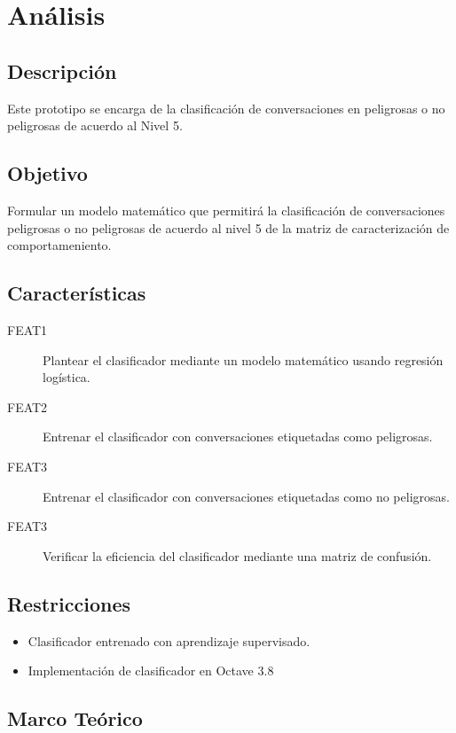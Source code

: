 \section{An\'alisis}

\subsection{Descripci\'on}

Este prototipo se encarga de la clasificaci\'on de conversaciones en peligrosas o no peligrosas de acuerdo al Nivel 5.

\subsection{Objetivo}
Formular un modelo matem\'atico que permitir\'a la clasificaci\'on de conversaciones peligrosas o no peligrosas de acuerdo al nivel 5 de la matriz de caracterizaci\'on de comportameniento.

\subsection{Caracter\'isticas}
\begin{description}
\item[FEAT1] Plantear el clasificador mediante un modelo matem\'atico usando regresi\'on log\'istica.
\item[FEAT2] Entrenar el clasificador con conversaciones etiquetadas como peligrosas.
\item[FEAT3] Entrenar el clasificador con conversaciones etiquetadas como no peligrosas.
\item[FEAT3] Verificar la eficiencia del clasificador mediante una matriz de confusi\'on.
\end{description}			

\subsection{Restricciones}

\begin{itemize}
\item Clasificador entrenado con aprendizaje supervisado.
\item Implementaci\'on de clasificador en Octave 3.8
\end{itemize}


\subsection{Marco Te\'orico}
